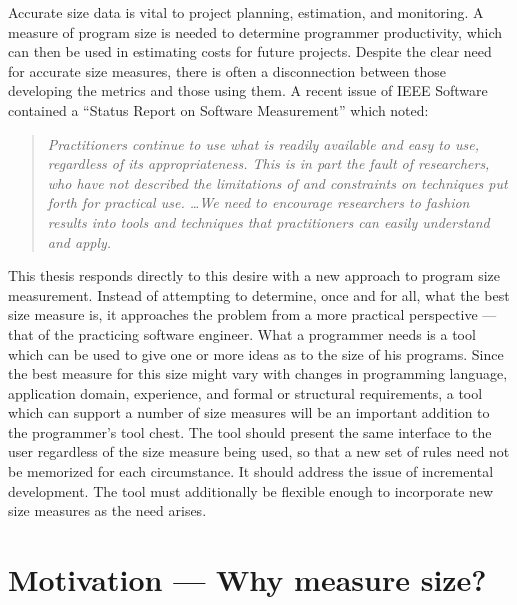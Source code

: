 Accurate size data is vital to project planning, estimation, and
monitoring.  A measure of program size is needed to determine programmer
productivity, which can then be used in estimating costs for future
projects.  Despite the clear need for accurate size measures, there is 
often a disconnection between those developing the metrics and those
using them. A recent issue of IEEE Software contained a ``Status
Report on Software Measurement''\cite{Pfleeger97} which noted:
\begin{quotation}
  \em
  Practitioners continue to use what is readily available and easy to
  use, regardless of its appropriateness.  This is in part the fault
  of researchers, who have not described the limitations of and
  constraints on techniques put forth for practical use. \ldots We need 
  to encourage researchers to fashion results into tools and
  techniques that practitioners can easily understand and apply.
\end{quotation}
This thesis responds directly to this desire with a new approach to
program size measurement.  Instead of attempting to determine, once
and for all, what the best size measure is, it approaches the problem
from a more practical perspective --- that of the practicing software
engineer. What a programmer needs is a tool which can be used to give
one or more ideas as to the size of his programs.  Since the best measure for
this size might vary with changes in programming language, application
domain, experience, and formal or structural requirements, a tool
which can support a number of size measures will be an
important addition to the programmer's tool chest.  The tool should
present the same interface to the user regardless of the size measure
being used, so that a new set of rules need not be memorized for each
circumstance.  It should address the issue of incremental
development. The tool must additionally be flexible enough to
incorporate new size measures as the need arises.


\section{Motivation --- Why measure size?}

